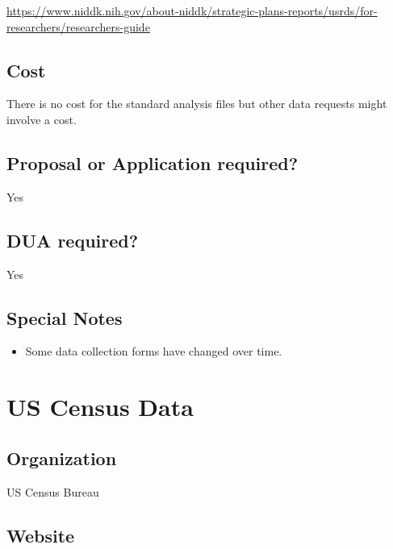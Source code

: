 \documentclass[
]{book}
\providecommand{\tightlist}{%
  \setlength{\itemsep}{0pt}\setlength{\parskip}{0pt}}
\begin{document}
\url{https://www.niddk.nih.gov/about-niddk/strategic-plans-reports/usrds/for-researchers/researchers-guide}

\hypertarget{cost-92}{%
\section{Cost}\label{cost-92}}

There is no cost for the standard analysis files but other data requests might involve a cost.

\hypertarget{proposal-or-application-required-92}{%
\section{Proposal or Application required?}\label{proposal-or-application-required-92}}

Yes

\hypertarget{dua-required-92}{%
\section{DUA required?}\label{dua-required-92}}

Yes

\hypertarget{special-notes-92}{%
\section{Special Notes}\label{special-notes-92}}

\begin{itemize}
\tightlist
\item
  Some data collection forms have changed over time.
\end{itemize}

\mainmatter

\hypertarget{us-census-data}{%
\chapter{US Census Data}\label{us-census-data}}

\hypertarget{organization-93}{%
\section{Organization}\label{organization-93}}

US Census Bureau

\hypertarget{website-93}{%
\section{Website}\label{website-93}}
\end{document}
